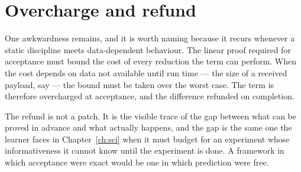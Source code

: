 \section{Overcharge and refund}

One awkwardness remains, and it is worth naming because it recurs
whenever a static discipline meets data-dependent behaviour.
The linear proof required for acceptance must bound the cost of every
reduction the term can perform.
When the cost depends on data not available until run time --- the size
of a received payload, say --- the bound must be taken over the worst
case.
The term is therefore overcharged at acceptance, and the difference
refunded on completion.

The refund is not a patch.
It is the visible trace of the gap between what can be proved in advance
and what actually happens, and the gap is the same one the learner faces
in Chapter~\ref{ch:sci} when it must budget for an experiment whose
informativeness it cannot know until the experiment is done.
A framework in which acceptance were exact would be one in which
prediction were free.

